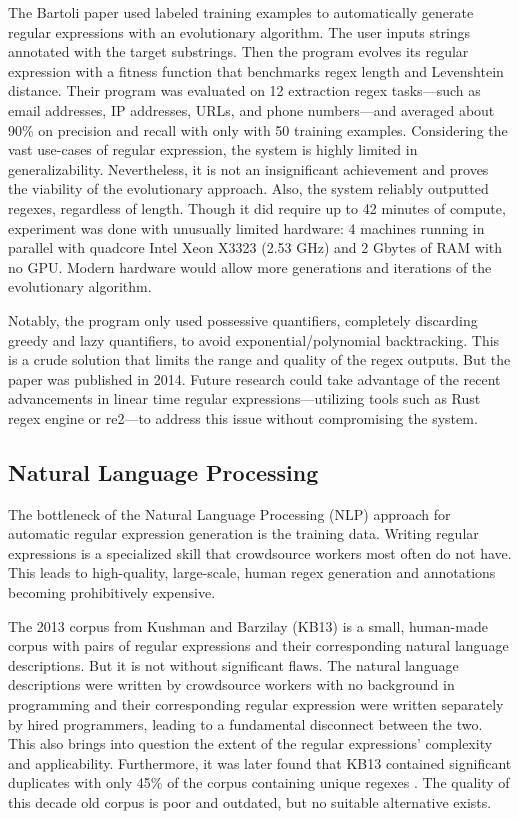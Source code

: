 \documentclass[10pt,twocolumn]{article}
\begin{document}
The Bartoli paper used labeled training examples to automatically generate regular expressions with an evolutionary algorithm\cite{bartoli2014}. The user inputs strings annotated with the target substrings. Then the program evolves its regular expression with a fitness function that benchmarks regex length and Levenshtein distance. Their program was evaluated on 12 extraction regex tasks—such as email addresses, IP addresses, URLs, and phone numbers—and averaged about 90\% on precision and recall with only with 50 training examples. Considering the vast use-cases of regular expression, the system is highly limited in generalizability. Nevertheless, it is not an insignificant achievement and proves the viability of the evolutionary approach. Also, the system reliably outputted regexes, regardless of length. Though it did require up to 42 minutes of compute, experiment was done with unusually limited hardware: 4 machines running in parallel with quadcore Intel Xeon X3323 (2.53 GHz) and 2 Gbytes of RAM with no GPU. Modern hardware would allow more generations and iterations of the evolutionary algorithm.

Notably, the program only used possessive quantifiers, completely discarding greedy and lazy quantifiers, to avoid exponential/polynomial backtracking. This is a crude solution that limits the range and quality of the regex outputs. But the paper was published in 2014. Future research could take advantage of the recent advancements in linear time regular expressions—utilizing tools such as Rust regex engine or re2—to address this issue without compromising the system.

\subsection{Natural Language Processing}

The bottleneck of the Natural Language Processing (NLP) approach for automatic regular expression generation is the training data. Writing regular expressions is a specialized skill that crowdsource workers most often do not have. This leads to high-quality, large-scale, human regex generation and annotations becoming prohibitively expensive.

The 2013 corpus from Kushman and Barzilay (KB13) is a small, human-made corpus with pairs of regular expressions and their corresponding natural language descriptions\cite{kushman2013}. But it is not without significant flaws. The natural language descriptions were written by crowdsource workers with no background in programming and their corresponding regular expression were written separately by hired programmers, leading to a fundamental disconnect between the two. This also brings into question the extent of the regular expressions' complexity and applicability. Furthermore, it was later found that KB13 contained significant duplicates with only 45\% of the corpus containing unique regexes \cite{locascio2016}. The quality of this decade old corpus is poor and outdated, but no suitable alternative exists.
\end{document}
